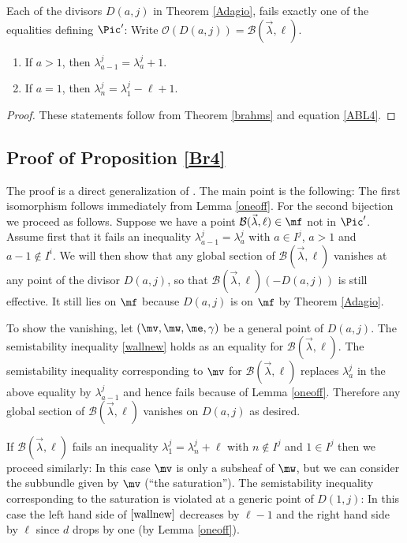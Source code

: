 \begin{lemma}
\notready\label{oneoff}
Each of the divisors $D(a,j)$ in Theorem \ref{Adagio}, fails exactly one of the equalities defining $\Pic'$:
Write $\mathcal{O}(D(a,j))=\mathcal{B}(\vec{\lambda},\ell)$.
\begin{enumerate}
\item If $a>1$, then $\lambda^j_{a-1}=\lambda^j_{a}+1$.
\item If $a=1$, then $\lambda^j_n =\lambda^j_1-\ell +1$.
\end{enumerate}
\end{lemma}
\begin{proof}
These statements follow from Theorem \ref{brahms} and  equation \eqref{ABL4}.
\end{proof}

\subsection{Proof of Proposition \ref{Br4}}

The proof is a direct generalization of \cite[Theorem 1.15]{BHermit}. The main point is the following: The first isomorphism follows immediately from Lemma \ref{oneoff}. For the second bijection we proceed as follows. Suppose we have  a point $\mathcal{B}(\vec{\lambda},\ell)\in\mf$ not in $\Pic'$. Assume first that it fails an inequality $\lambda^j_{a-1}=\lambda^{j}_{a}$ with $a\in I^j$, $a>1$ and $a-1\not\in I^i$. We will then show that any global section of  $\mathcal{B}(\vec{\lambda},\ell)$ vanishes at any point of the divisor $D(a,j)$, so that $\mathcal{B}(\vec{\lambda},\ell)(-D(a,j))$ is still effective. It still lies on $\mf$ because $D(a,j)$ is on $\mf$ by Theorem \ref{Adagio}.

To show the vanishing, let $(\mv,\mw,\me,\gamma)$ be a general point of $D(a,j)$. The semistability inequality \eqref{wallnew} holds as an equality for $\mathcal{B}(\vec{\lambda},\ell)$. The semistability inequality corresponding to $\mv$  for $\mathcal{B}(\vec{\lambda},\ell)$  replaces $\lambda^j_a$ in the above equality by $\lambda^j_{a-1}$ and hence fails because of Lemma \ref{oneoff}. Therefore any global section of $\mathcal{B}(\vec{\lambda},\ell)$ vanishes on $D(a,j)$ as desired.


If $\mathcal{B}(\vec{\lambda},\ell)$  fails an inequality  $\lambda^j_1=\lambda^{j}_{n}+\ell$ with $n\not\in I^j$ and $1\in I^j$ then we proceed similarly: In this case $\mv$ is only a subsheaf of $\mw$, but we can consider the subbundle given by $\mv$ (``the saturation''). The semistability inequality corresponding to the saturation is violated at a generic point of $D(1,j)$: In this case the left hand side of $\eqref{wallnew}$ decreases by $\ell-1$ and the right hand side by $\ell$ since $d$ drops by one (by Lemma \ref{oneoff}).


